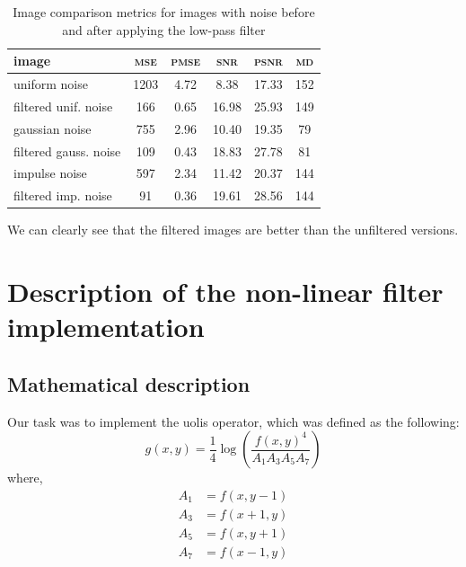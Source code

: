 \documentclass[12pt]{article}
\begin{document}
\begin{table}[H]\centering
    \begin{tabular}{l|ccccc}
        \toprule
        image                 & \textsc{mse} & \textsc{pmse} & \textsc{snr} & \textsc{psnr} & \textsc{md} \\
        \midrule[.5pt]
        uniform noise         & 1203         & 4.72          & 8.38         & 17.33         & 152         \\
        filtered unif. noise  & 166          & 0.65          & 16.98        & 25.93         & 149         \\
        \midrule[.1pt]
        gaussian noise        & 755          & 2.96          & 10.40        & 19.35         & 79          \\
        filtered gauss. noise & 109          & 0.43          & 18.83        & 27.78         & 81          \\
        \midrule[.1pt]
        impulse noise         & 597          & 2.34          & 11.42        & 20.37         & 144         \\
        filtered imp. noise   & 91           & 0.36          & 19.61        & 28.56         & 144         \\
        \bottomrule
    \end{tabular}
    \caption{Image comparison metrics for images with noise before and after applying the low-pass filter}
    \label{tab:lowpass-results-noise}
\end{table}

We can clearly see that the filtered images are better than the unfiltered versions.


\pagebreak[3]
\section{Description of the non-linear filter implementation }

\subsection{Mathematical description}

Our task was to implement the uolis operator, which was defined as the following:
\begin{equation}
    g(x,y) = \frac{1}{4} \log \left(
    \frac{f(x,y)^4}{A_1 A_3 A_5 A_7}
    \right)
    \label{eq:uolis}
\end{equation}
where,
\begin{align*}
    A_1 & = f(x,y-1) \\
    A_3 & = f(x+1,y) \\
    A_5 & = f(x,y+1) \\
    A_7 & = f(x-1,y)
\end{align*}
\end{document}

